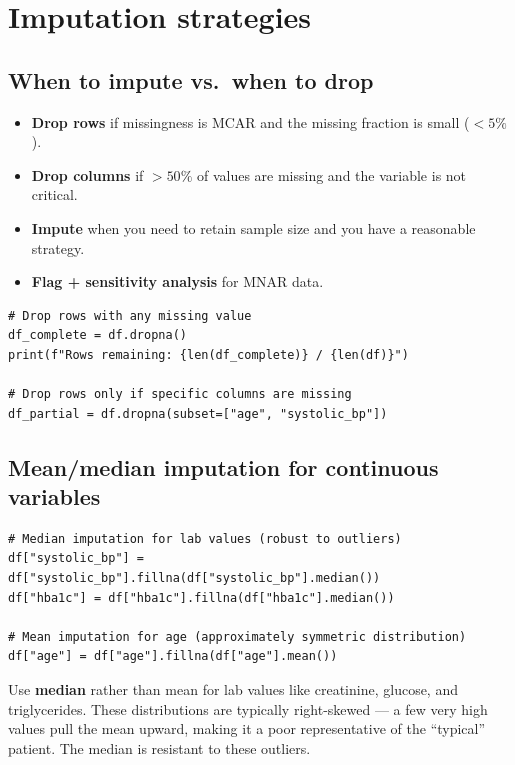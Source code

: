 \section{Imputation strategies}

\subsection{When to impute vs.\ when to drop}

\begin{itemize}
  \item \textbf{Drop rows} if missingness is MCAR and the missing fraction is small ($<5\%$).
  \item \textbf{Drop columns} if $>50\%$ of values are missing and the variable is not critical.
  \item \textbf{Impute} when you need to retain sample size and you have a reasonable strategy.
  \item \textbf{Flag + sensitivity analysis} for MNAR data.
\end{itemize}

\begin{verbatim}
# Drop rows with any missing value
df_complete = df.dropna()
print(f"Rows remaining: {len(df_complete)} / {len(df)}")

# Drop rows only if specific columns are missing
df_partial = df.dropna(subset=["age", "systolic_bp"])
\end{verbatim}

\subsection{Mean/median imputation for continuous variables}

\begin{verbatim}
# Median imputation for lab values (robust to outliers)
df["systolic_bp"] = df["systolic_bp"].fillna(df["systolic_bp"].median())
df["hba1c"] = df["hba1c"].fillna(df["hba1c"].median())

# Mean imputation for age (approximately symmetric distribution)
df["age"] = df["age"].fillna(df["age"].mean())
\end{verbatim}

\begin{clinicalnote}
Use \textbf{median} rather than mean for lab values like creatinine, glucose, and triglycerides. These distributions are typically right-skewed --- a few very high values pull the mean upward, making it a poor representative of the ``typical'' patient. The median is resistant to these outliers.
\end{clinicalnote}

